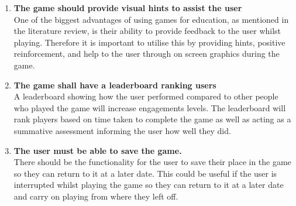 \documentclass[12pt,a4paper]{report}
\begin{document}
\begin{enumerate}[label*=\arabic*]
            
            	  \item \textbf{The game should provide visual hints to assist the user}\\
One of the biggest advantages of using games for education, as mentioned in the literature review, is their ability to provide feedback to the user whilst playing. Therefore it is important to utilise this by providing hints, positive reinforcement, and help to the user through on screen graphics during the game.
 

	  \item \textbf{The game shall have a leaderboard ranking users}\\
A leaderboard showing how the user performed compared to other people who played the game will increase engagements levels. The leaderboard will rank players based on time taken to complete the game as well as acting as a summative assessment informing the user how well they did. 

           

            	  \item \textbf{The user must be able to save the game.}\\
There should be the functionality for the user to save their place in the game so they can return to it at a later date. This could be useful if the user is interrupted whilst playing the game so they can return to it at a later date and carry on playing from where they left off.
            

            
            
        \end{enumerate}
        
\end{document}
